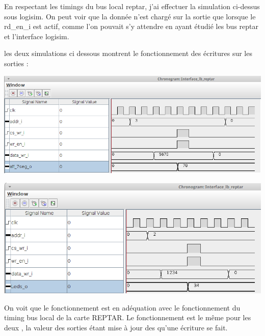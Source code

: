 En respectant les timings du bus local reptar, j'ai effectuer la simulation ci-dessus sous logisim. On peut voir que la donnée n'est chargé sur la sortie que lorsque le rd\_en\_i est actif, comme l'on pouvait s'y attendre en ayant étudié les bus reptar et l'interface logisim.\\\par
les deux simulations ci dessous montrent le fonctionnement des écritures sur les sorties : \\
\begin{center}
\includegraphics[scale=0.65]{./images/Test_Part1_WriteAFF_Timing_Bus_Reptar.png}
\end{center}
\begin{center}
\includegraphics[scale=0.75]{./images/Test_Part1_WriteLED_Timing_Bus_Reptar.png}\\\par
{}
\end{center}\par
On voit que le fonctionnement est en adéquation avec le fonctionnement du timing bus local de la carte REPTAR. Le fonctionnement est le même pour les deux , la valeur des sorties étant mise à jour des qu'une écriture se fait.
